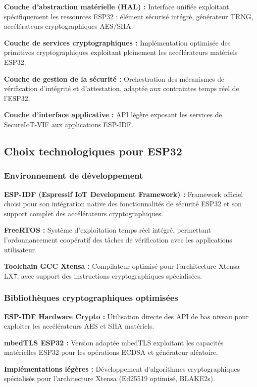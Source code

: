 \textbf{Couche d'abstraction matérielle (HAL) :} Interface unifiée exploitant spécifiquement les ressources ESP32 : élément sécurisé intégré, générateur TRNG, accélérateurs cryptographiques AES/SHA.

\textbf{Couche de services cryptographiques :} Implémentation optimisée des primitives cryptographiques exploitant pleinement les accélérateurs matériels ESP32.

\textbf{Couche de gestion de la sécurité :} Orchestration des mécanismes de vérification d'intégrité et d'attestation, adaptée aux contraintes temps réel de l'ESP32.

\textbf{Couche d'interface applicative :} API légère exposant les services de SecureIoT-VIF aux applications ESP-IDF.

\subsection{Choix technologiques pour ESP32}

\subsubsection{Environnement de développement}

\textbf{ESP-IDF (Espressif IoT Development Framework) :} Framework officiel choisi pour son intégration native des fonctionnalités de sécurité ESP32 et son support complet des accélérateurs cryptographiques.

\textbf{FreeRTOS :} Système d'exploitation temps réel intégré, permettant l'ordonnancement coopératif des tâches de vérification avec les applications utilisateur.

\textbf{Toolchain GCC Xtensa :} Compilateur optimisé pour l'architecture Xtensa LX7, avec support des instructions cryptographiques spécialisées.

\subsubsection{Bibliothèques cryptographiques optimisées}

\textbf{ESP-IDF Hardware Crypto :} Utilisation directe des API de bas niveau pour exploiter les accélérateurs AES et SHA matériels.

\textbf{mbedTLS ESP32 :} Version adaptée mbedTLS exploitant les capacités matérielles ESP32 pour les opérations ECDSA et générateur aléatoire.

\textbf{Implémentations légères :} Développement d'algorithmes cryptographiques spécialisés pour l'architecture Xtensa (Ed25519 optimisé, BLAKE2s).

